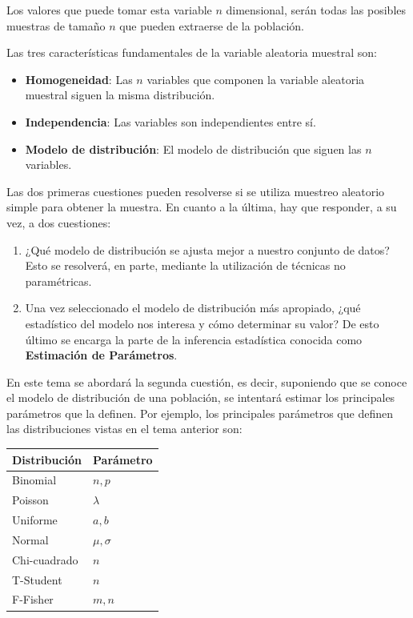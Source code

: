 \documentclass[
  a4paper,
]{scrreport}
\providecommand{\tightlist}{%
  \setlength{\itemsep}{0pt}\setlength{\parskip}{0pt}}\usepackage{longtable,booktabs,array}
\theoremstyle{plain}
\theoremstyle{definition}
\theoremstyle{definition}
\theoremstyle{remark}
\begin{document}
Los valores que puede tomar esta variable \(n\) dimensional, serán todas
las posibles muestras de tamaño \(n\) que pueden extraerse de la
población.

Las tres características fundamentales de la variable aleatoria muestral
son:

\begin{itemize}
\item
  \textbf{Homogeneidad}: Las \(n\) variables que componen la variable
  aleatoria muestral siguen la misma distribución.
\item
  \textbf{Independencia}: Las variables son independientes entre sí.
\item
  \textbf{Modelo de distribución}: El modelo de distribución que siguen
  las \(n\) variables.
\end{itemize}

Las dos primeras cuestiones pueden resolverse si se utiliza muestreo
aleatorio simple para obtener la muestra. En cuanto a la última, hay que
responder, a su vez, a dos cuestiones:

\begin{enumerate}
\def\labelenumi{\arabic{enumi}.}
\tightlist
\item
  ¿Qué modelo de distribución se ajusta mejor a nuestro conjunto de
  datos? Esto se resolverá, en parte, mediante la utilización de
  técnicas no paramétricas.
\item
  Una vez seleccionado el modelo de distribución más apropiado, ¿qué
  estadístico del modelo nos interesa y cómo determinar su valor? De
  esto último se encarga la parte de la inferencia estadística conocida
  como \textbf{Estimación de Parámetros}.
\end{enumerate}

En este tema se abordará la segunda cuestión, es decir, suponiendo que
se conoce el modelo de distribución de una población, se intentará
estimar los principales parámetros que la definen. Por ejemplo, los
principales parámetros que definen las distribuciones vistas en el tema
anterior son:

\begin{longtable}[]{@{}ll@{}}
\toprule\noalign{}
Distribución & Parámetro \\
\midrule\noalign{}
\endhead
\bottomrule\noalign{}
\endlastfoot
Binomial & \(n,p\) \\
Poisson & \(\lambda\) \\
Uniforme & \(a,b\) \\
Normal & \(\mu,\sigma\) \\
Chi-cuadrado & \(n\) \\
T-Student & \(n\) \\
F-Fisher & \(m,n\) \\
\end{longtable}
\end{document}
